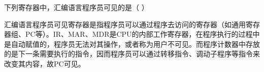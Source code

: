 \question 下列寄存器中，汇编语言程序员可见的是（ ）
\par{}
\begin{solution}汇编语言程序员可见寄存器是指程序员可以通过程序去访问的寄存器（如通用寄存器组、PC等）。IR、MAR、MDR是CPU的内部工作寄存器，在程序执行的过程中是自动赋值的，程序员无法对其操作，或者称为用户不可见。而程序计数器中存放的是下一条需要执行的指令，因而程序员可以通过转移指令、调动子程序等指令来改变其内容，故PC可见。
\end{solution}
